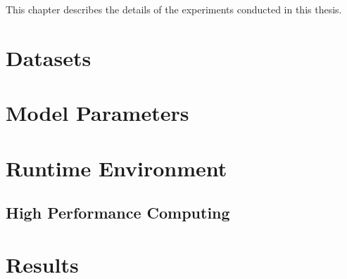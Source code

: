 
This chapter describes the details of the experiments conducted in this thesis. 

\section{Datasets} \label{section:datasets}


\section{Model Parameters} \label{section:model parameters}

\section{Runtime Environment} \label{section:runtime environment}

\subsection{High Performance Computing} \label{subsection:hpc}

\section{Results} \label{section:results}